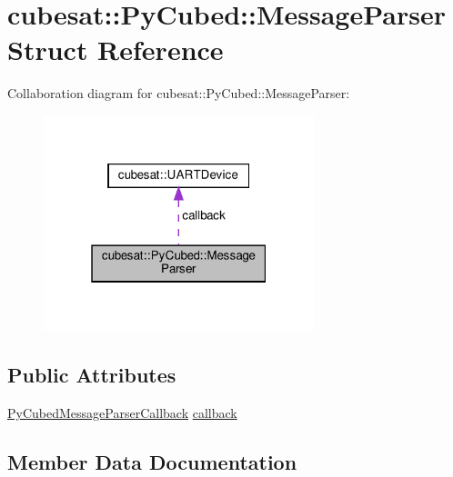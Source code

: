 \hypertarget{structcubesat_1_1PyCubed_1_1MessageParser}{}\section{cubesat\+:\+:Py\+Cubed\+:\+:Message\+Parser Struct Reference}
\label{structcubesat_1_1PyCubed_1_1MessageParser}


Collaboration diagram for cubesat\+:\+:Py\+Cubed\+:\+:Message\+Parser\+:
\nopagebreak
\begin{figure}[H]
\begin{center}
\leavevmode
\includegraphics[width=223pt]{structcubesat_1_1PyCubed_1_1MessageParser__coll__graph}
\end{center}
\end{figure}
\subsection*{Public Attributes}
\begin{DoxyCompactItemize}
\item 
\hyperlink{namespacecubesat_ad7197c1bfb09998ced84827cb0dd1680}{Py\+Cubed\+Message\+Parser\+Callback} \hyperlink{structcubesat_1_1PyCubed_1_1MessageParser_aebe4576060c45c177677017e55f1a2db}{callback}
\end{DoxyCompactItemize}


\subsection{Member Data Documentation}
\mbox{\label{structcubesat_1_1PyCubed_1_1MessageParser_aebe4576060c45c177677017e55f1a2db}} 
